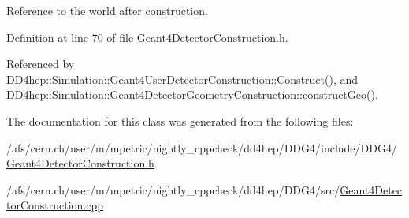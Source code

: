 Reference to the world after construction. 

Definition at line 70 of file Geant4DetectorConstruction.h.

Referenced by DD4hep::Simulation::Geant4UserDetectorConstruction::Construct(), and DD4hep::Simulation::Geant4DetectorGeometryConstruction::constructGeo().

The documentation for this class was generated from the following files:\begin{DoxyCompactItemize}
\item 
/afs/cern.ch/user/m/mpetric/nightly\_\-cppcheck/dd4hep/DDG4/include/DDG4/\hyperlink{_geant4_detector_construction_8h}{Geant4DetectorConstruction.h}\item 
/afs/cern.ch/user/m/mpetric/nightly\_\-cppcheck/dd4hep/DDG4/src/\hyperlink{_geant4_detector_construction_8cpp}{Geant4DetectorConstruction.cpp}\end{DoxyCompactItemize}
